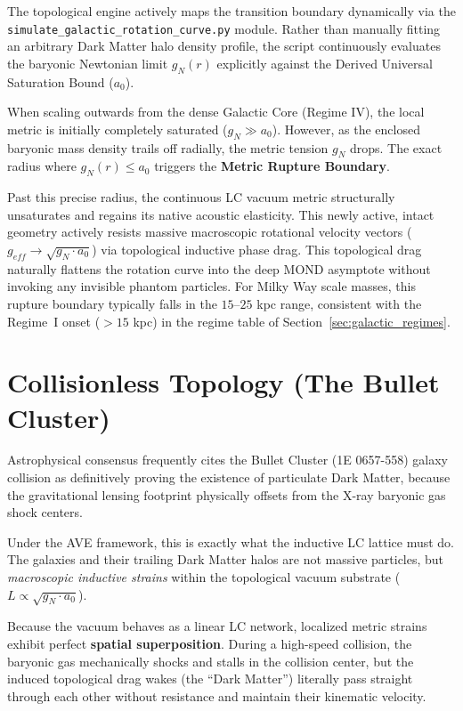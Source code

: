 The topological engine actively maps the transition boundary dynamically via the \texttt{simulate\_\allowbreak galactic\_\allowbreak rotation\_\allowbreak curve.py} module. Rather than manually fitting an arbitrary Dark Matter halo density profile, the script continuously evaluates the baryonic Newtonian limit $g_N(r)$ explicitly against the Derived Universal Saturation Bound ($a_0$).

When scaling outwards from the dense Galactic Core (Regime IV), the local metric is initially completely saturated ($g_N \gg a_0$). However, as the enclosed baryonic mass density trails off radially, the metric tension $g_N$ drops. The exact radius where $g_N(r) \le a_0$ triggers the \textbf{Metric Rupture Boundary}. 

Past this precise radius, the continuous LC vacuum metric structurally unsaturates and regains its native acoustic elasticity. This newly active, intact geometry actively resists massive macroscopic rotational velocity vectors ($g_{eff} \to \sqrt{g_N \cdot a_0}$) via topological inductive phase drag. This topological drag naturally flattens the rotation curve into the deep MOND asymptote without invoking any invisible phantom particles. For Milky Way scale masses, this rupture boundary typically falls in the $15$--$25$ kpc range, consistent with the Regime~I onset ($> 15$ kpc) in the regime table of Section~\ref{sec:galactic_regimes}.

\section{Collisionless Topology (The Bullet Cluster)}
\label{sec:bullet_cluster}

Astrophysical consensus frequently cites the Bullet Cluster (1E 0657-558) galaxy collision as definitively proving the existence of particulate Dark Matter, because the gravitational lensing footprint physically offsets from the X-ray baryonic gas shock centers. 

Under the AVE framework, this is exactly what the inductive LC lattice must do. The galaxies and their trailing Dark Matter halos are not massive particles, but \textit{macroscopic inductive strains} within the topological vacuum substrate ($L \propto \sqrt{g_N \cdot a_0}$). 

Because the vacuum behaves as a linear LC network, localized metric strains exhibit perfect \textbf{spatial superposition}. During a high-speed collision, the baryonic gas mechanically shocks and stalls in the collision center, but the induced topological drag wakes (the ``Dark Matter'') literally pass straight through each other without resistance and maintain their kinematic velocity.

